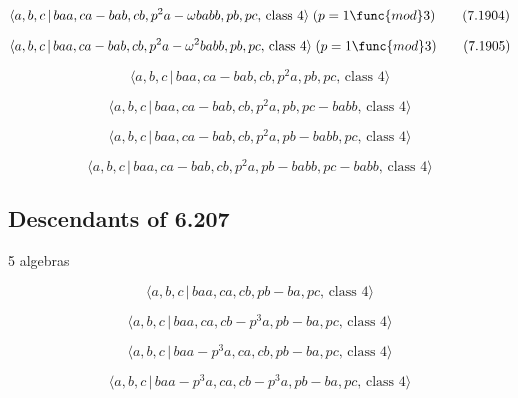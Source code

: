 \documentclass[10pt]{article}
\begin{document}
\begin{equation}
\langle a,b,c\,|\,baa,ca-bab,cb,p^{2}a-\omega babb,pb,pc,\,\text{class }%
4\rangle \;(p=1\func{mod}3)  \tag{7.1904}
\end{equation}

\begin{equation}
\langle a,b,c\,|\,baa,ca-bab,cb,p^{2}a-\omega ^{2}babb,pb,pc,\,\text{class }%
4\rangle \;(p=1\func{mod}3)  \tag{7.1905}
\end{equation}

\begin{equation}
\langle a,b,c\,|\,baa,ca-bab,cb,p^2a,pb,pc,\,\text{class }4\rangle 
\tag{7.1906}
\end{equation}

\begin{equation}
\langle a,b,c\,|\,baa,ca-bab,cb,p^2a,pb,pc-babb,\,\text{class }4\rangle 
\tag{7.1907}
\end{equation}

\begin{equation}
\langle a,b,c\,|\,baa,ca-bab,cb,p^2a,pb-babb,pc,\,\text{class }4\rangle 
\tag{7.1908}
\end{equation}

\begin{equation}
\langle a,b,c\,|\,baa,ca-bab,cb,p^2a,pb-babb,pc-babb,\,\text{class }4\rangle
\tag{7.1909}
\end{equation}

\subsection{Descendants of 6.207}

5 algebras

\begin{equation}
\langle a,b,c\,|\,baa,ca,cb,pb-ba,pc,\,\text{class }4\rangle  \tag{7.1910}
\end{equation}

\begin{equation}
\langle a,b,c\,|\,baa,ca,cb-p^3a,pb-ba,pc,\,\text{class }4\rangle 
\tag{7.1911}
\end{equation}

\begin{equation}
\langle a,b,c\,|\,baa-p^3a,ca,cb,pb-ba,pc,\,\text{class }4\rangle 
\tag{7.1912}
\end{equation}

\begin{equation}
\langle a,b,c\,|\,baa-p^3a,ca,cb-p^3a,pb-ba,pc,\,\text{class }4\rangle 
\tag{7.1913}
\end{equation}
\end{document}
